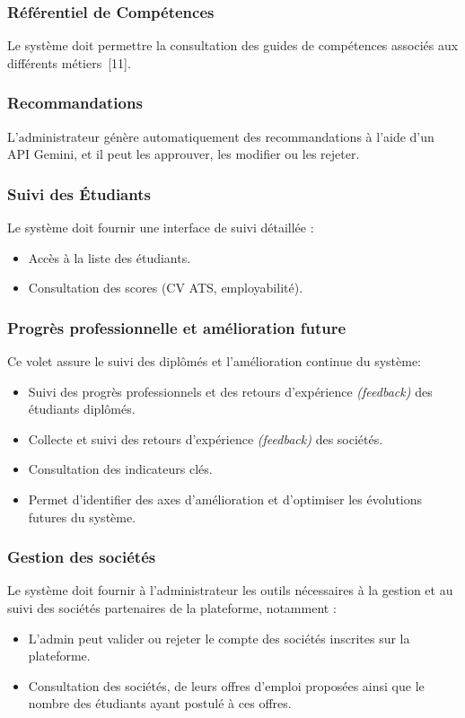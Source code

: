 \subsubsection*{Référentiel de Compétences}
Le système doit permettre la consultation des guides de compétences associés aux différents métiers~[11]. 
\subsubsection*{Recommandations}
L’administrateur génère automatiquement des recommandations à l'aide d’un API Gemini, et il peut les approuver, les modifier ou les rejeter.
\subsubsection*{Suivi  des Étudiants}
Le système doit fournir une interface de suivi détaillée :
\begin{itemize}
  \item Accès à la liste des étudiants.
  \item Consultation des scores (CV ATS, employabilité).
\end{itemize}

\subsubsection*{Progrès professionnelle et amélioration future}
Ce volet assure le suivi des diplômés et l’amélioration continue du système:
\begin{itemize}
  \item Suivi des progrès professionnels et des retours d’expérience \textit{(feedback)} des étudiants diplômés.
  \item Collecte et suivi des retours d’expérience \textit{(feedback)} des sociétés.
  \item Consultation des indicateurs clés.
  \item Permet d’identifier des axes d’amélioration et d’optimiser les évolutions futures du système.
\end{itemize}

\subsubsection*{Gestion des sociétés}
Le système doit fournir à l’administrateur les outils nécessaires à la gestion et au suivi des sociétés partenaires de la plateforme, notamment :
\begin{itemize}
  \item L’admin peut valider ou rejeter le compte des sociétés inscrites sur la plateforme. 
  \item Consultation des sociétés, de leurs offres d’emploi proposées ainsi que le nombre des étudiants ayant postulé à ces offres.
 
\end{itemize}
